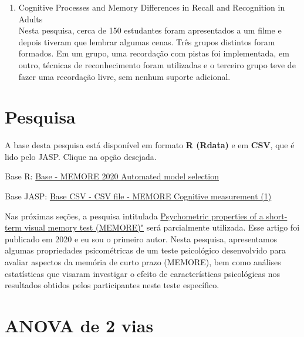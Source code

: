 \documentclass[
]{book}
\providecommand{\tightlist}{%
  \setlength{\itemsep}{0pt}\setlength{\parskip}{0pt}}
\newenvironment{base}{
  \definecolor{shadecolor}{rgb}{0.972,0.972,0.972}  %
  \color{black}
  \begin{shaded}}
 {\end{shaded}}
\begin{document}
\begin{enumerate}
\def\labelenumi{\arabic{enumi}.}
\tightlist
\item
  Cognitive Processes and Memory Differences in Recall and Recognition in Adults\\
  Nesta pesquisa, cerca de 150 estudantes foram apresentados a um filme e depois tiveram que lembrar algumas cenas. Três grupos distintos foram formados. Em um grupo, uma recordação com pistas foi implementada, em outro, técnicas de reconhecimento foram utilizadas e o terceiro grupo teve de fazer uma recordação livre, sem nenhum suporte adicional.
\end{enumerate}

\hypertarget{pesquisa-5}{%
\section{Pesquisa}\label{pesquisa-5}}

\begin{base}
A base desta pesquisa está disponível em formato \textbf{R (Rdata)} e em \textbf{CSV}, que é lido pelo JASP. Clique na opção desejada.

Base R: \href{https://github.com/anovabr/mqt/raw/master/bases/Base\%20-\%20MEMORE\%202020\%20Automated\%20model\%20selection.RData}{Base - MEMORE 2020 Automated model selection}

Base JASP: \href{https://github.com/anovabr/mqt/raw/master/bases/bases_csv_jasp.zip}{Base CSV - CSV file - MEMORE Cognitive measurement (1)}

\end{base}

Nas próximas seções, a pesquisa intitulada \href{https://www.neuropsicolatina.org/index.php/Neuropsicologia_Latinoamericana/article/view/545}{Psychometric properties of a short-term visual memory test (MEMORE)"} será parcialmente utilizada. Esse artigo foi publicado em 2020 e eu sou o primeiro autor. Nesta pesquisa, apresentamos algumas propriedades psicométricas de um teste psicológico desenvolvido para avaliar aspectos da memória de curto prazo (MEMORE), bem como análises estatísticas que visaram investigar o efeito de características psicológicas nos resultados obtidos pelos participantes neste teste específico.

\hypertarget{anova-de-2-vias}{%
\section{ANOVA de 2 vias}\label{anova-de-2-vias}}
\end{document}
